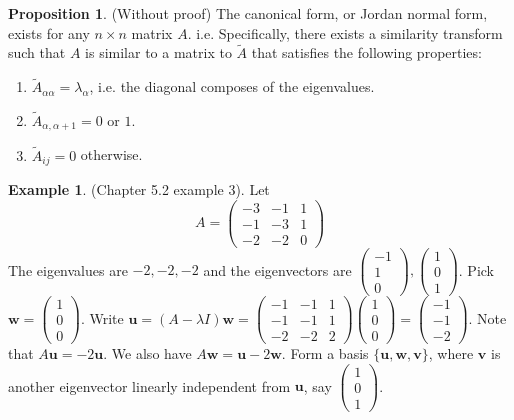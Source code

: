 \documentclass[a4paper]{article}
\theoremstyle{definition}
\newtheorem*{prop}{Proposition}
\newtheorem*{eg}{Example}
\newcommand{\mb}[1]{\mathbf{#1}}
\begin{document}
\begin{prop}
  (Without proof) The canonical form, or Jordan normal form, exists for any $n\times n$ matrix $A$. i.e. Specifically, there exists a similarity transform such that $A$ is similar to a matrix to $\tilde{A}$ that satisfies the following properties:
  \begin{enumerate}
  \item $\tilde{A}_{\alpha\alpha} = \lambda_\alpha$, i.e. the diagonal composes of the eigenvalues.
  \item $\tilde{A}_{\alpha, \alpha + 1} = 0$ or $1$.
  \item $\tilde{A}_{ij} = 0$ otherwise.
  \end{enumerate}
\end{prop}

\begin{eg}
  (Chapter 5.2 example 3). Let
  \[
  A = \begin{pmatrix}
    -3 & -1 & 1\\
    -1 & -3 & 1\\
    -2 & -2 & 0
  \end{pmatrix}
  \]
  The eigenvalues are $-2, -2, -2$ and the eigenvectors are $
  \begin{pmatrix}
    -1 \\1 \\ 0
  \end{pmatrix}, 
  \begin{pmatrix}
    1 \\ 0 \\1
  \end{pmatrix}$. Pick $\mb{w} = 
  \begin{pmatrix}
    1\\0\\0
  \end{pmatrix}$. Write $\mb{u} = (A - \lambda I)\mb{w} = 
  \begin{pmatrix}
    -1 & -1 & 1\\
    -1 & -1 & 1\\
    -2 & -2 & 2
  \end{pmatrix}
  \begin{pmatrix}
    1\\0\\0
  \end{pmatrix} = 
  \begin{pmatrix}
    -1\\-1\\-2
  \end{pmatrix}$. Note that $A\mb{u} = -2\mb{u}$. We also have $A\mb{w} = \mb{u} - 2\mb{w}$. Form a basis $\{\mb{u}, \mb{w}, \mb{v}\}$, where $\mb{v}$ is another eigenvector linearly independent from $\mb{u}$, say $
  \begin{pmatrix}
    1\\0\\1
  \end{pmatrix}$.


\end{eg}
\end{document}
